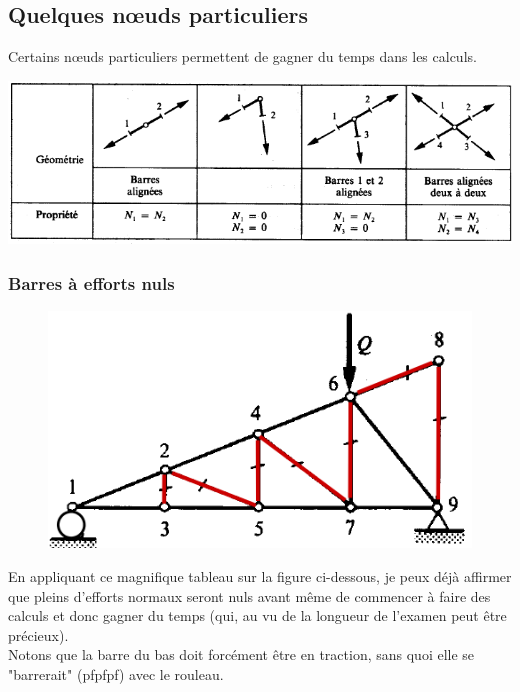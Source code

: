 	\subsection{Quelques nœuds particuliers}
	Certains nœuds particuliers permettent de gagner du temps dans les calculs.
	\begin{center}
	\includegraphics[scale=0.5]{ch3/image6.png}
	\end{center}
	
	
		\subsubsection{Barres à efforts nuls}
		\begin{figure}
		\vspace{-6mm}
		\includegraphics[scale=0.4]{ch3/image7.png}
		\end{figure}
		En appliquant ce magnifique tableau sur la figure 
		ci-dessous, je peux déjà affirmer que pleins d'efforts normaux seront 
		nuls avant même de commencer à faire des calculs et donc gagner du 
		temps (qui, au vu de la longueur de l'examen peut être précieux).\\
		Notons que la barre du bas doit forcément être en traction, sans quoi 
		elle se "barrerait" (pfpfpf) avec le rouleau. 
		
